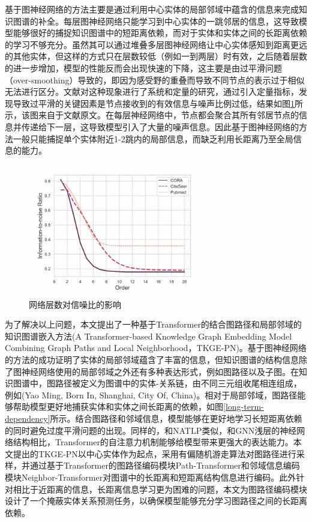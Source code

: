 基于图神经网络的方法主要是通过利用中心实体的局部邻域中蕴含的信息来完成知识图谱的补全。每层图神经网络只能学习到中心实体的一跳邻居的信息，这导致模型能够很好的捕捉知识图谱中的短距离依赖，而对于实体和实体之间的长距离依赖的学习不够充分。虽然其可以通过堆叠多层图神经网络让中心实体感知到距离更远的其他实体，但这样的方式只在层数较低（例如一到两层）时有效，之后随着层数的进一步增加，模型的性能反而会出现快速的下降，这主要是由过平滑问题（over-smoothing）导致的，即因为感受野的重叠而导致不同节点的表示过于相似无法进行区分。文献\cite{over-smoothing}对这种现象进行了系统和定量的研究，通过引入定量指标，发现导致过平滑的关键因素是节点接收到的有效信息与噪声比例过低，结果如图\ref{information-noise}所示，该图来自于文献\cite{over-smoothing}原文。在每层神经网络中，节点都会聚合其所有邻居节点的信息并传递给下一层，这导致模型引入了大量的噪声信息。因此基于图神经网络的方法一般只能捕捉单个实体附近1-2跳内的局部信息，而缺乏利用长距离乃至全局信息的能力。
\begin{figure}[htb]
  \centerline{\includegraphics[width=0.7\textwidth]{pic/information-noise.png}}
  \caption{网络层数对信噪比的影响}
  \label{information-noise}
\end{figure}

为了解决以上问题，本文提出了一种基于Transformer的结合图路径和局部邻域的知识图谱嵌入方法(A Transformer-based Knowledge Graph Embedding Model Combining Graph Paths and Local Neighborhood，TKGE-PN)。基于图神经网络的方法的成功证明了实体的局部邻域蕴含了丰富的信息，但知识图谱的结构信息除了图神经网络使用的局部邻域之外还有多种表达形式，例如图路径以及子图。在知识图谱中，图路径被定义为图谱中的实体-关系链，由不同三元组收尾相连组成，例如(Yao Ming, Born In, Shanghai, City Of, China)。相对于局部邻域，图路径能够帮助模型更好地捕获实体和实体之间长距离的依赖，如图\ref{long-term-dependency}所示。结合图路径和邻域信息，模型能够在更好地学习长短距离依赖的同时避免过度平滑问题的出现。同样的，和NATLP类似，和GNN浅层的神经网络结构相比，Transformer的自注意力机制能够给模型带来更强大的表达能力。本文提出的TKGE-PN以中心实体作为起点，采用有偏随机游走算法对图路径进行采样，并通过基于Transformer的图路径编码模块Path-Transformer和邻域信息编码模块Neighbor-Transformer对图谱中的长距离和短距离结构信息进行编码。此外针对相比于近距离的信息，长距离信息学习更为困难的问题，本文为图路径编码模块设计了一个掩蔽实体关系预测任务，以确保模型能够充分学习图路径之间的长距离依赖。

